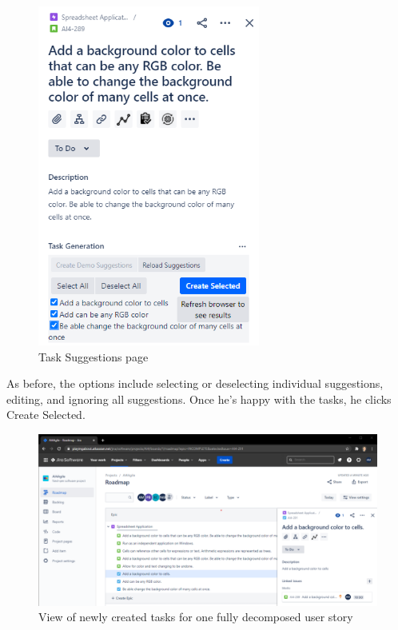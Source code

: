 \begin{figure}
\centerline{\includegraphics[width=0.65\textwidth,height=0.65\textheight,keepaspectratio]{./figure/Scenario1Figure4.png}}
\caption{Task Suggestions page}
\end{figure}

As before, the options include selecting or deselecting individual suggestions, editing, and ignoring all suggestions. Once he’s happy with the tasks, he clicks Create Selected.

\begin{figure}
\centerline{\includegraphics[width=\textwidth,height=\textheight,keepaspectratio]{./figure/Scenario1Figure5.png}}
\caption{View of newly created tasks for one fully decomposed user story}
\end{figure}

